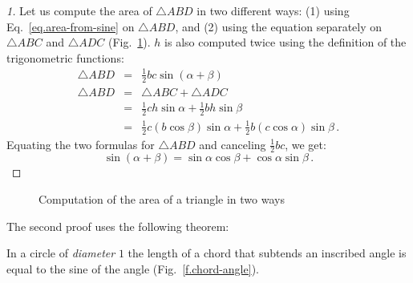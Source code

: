 \begin{proof}[1]
Let us compute the area of $\triangle ABD$ in two different ways: (1) using Eq.~\ref{eq.area-from-sine} on $\triangle ABD$, and (2) using the equation separately on $\triangle ABC$ and $\triangle ADC$ (Fig.~\ref{f.sin-sum2}).
$h$ is also computed twice using the definition of the trigonometric functions:
\begin{eqnarray*}
\triangle ABD &=& \frac{1}{2}bc\sin(\alpha+\beta)\\
\triangle ABD &=& \triangle ABC+\triangle ADC\\
&=& \frac{1}{2}ch\sin \alpha + \frac{1}{2}bh\sin \beta\\
&=& \frac{1}{2}c(b\cos\beta)\sin \alpha + \frac{1}{2}b(c\cos\alpha)\sin \beta\,.
\end{eqnarray*}
Equating the two formulas for $\triangle ABD$ and canceling $\frac{1}{2}bc$, we get:
\[
\sin(\alpha+\beta)=\sin\alpha\cos\beta+\cos \alpha\sin\beta\,.
\]
\end{proof}


\begin{figure}[tb]
\begin{center}
\end{center}
\caption{Computation of the area of a triangle in two ways}\label{f.sin-sum2}
\end{figure}

\enlargethispage{\baselineskip}

The second proof uses the following theorem:
\begin{theorem}
In a circle of \emph{diameter} $1$ the length of a chord that subtends an inscribed angle is equal to the sine of the angle (Fig.~\ref{f.chord-angle}).
\end{theorem}

